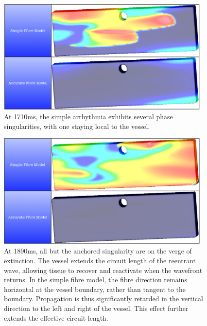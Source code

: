     \begin{figure}[htbp]
  		\centering
  	    \includegraphics[width=0.95\textwidth]{Ch5/Figs/shock_induced_1710ms}
              \caption{At 1710ms, the simple arrhythmia exhibits several phase singularities, with one staying local to the vessel.}
  	  \label{fig:shock_induced_1710ms}
  	\end{figure}
  	
    \begin{figure}[htbp]
  		\centering
  	    \includegraphics[width=0.95\textwidth]{Ch5/Figs/shock_induced_1890ms}
              \caption{At 1890ms, all but the anchored singularity are on the verge of extinction. The vessel extends the circuit length of the reentrant wave, allowing tissue to recover and reactivate when the wavefront returns. In the simple fibre model, the fibre direction remains horizontal at the vessel boundary, rather than tangent to the boundary. Propagation is thus significantly retarded in the vertical direction to the left and right of the vessel. This effect further extends the effective circuit length.}
  	  \label{fig:shock_induced_1890ms}
  	\end{figure}
  	

